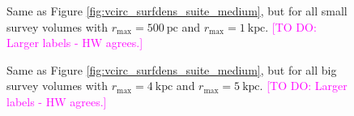 \documentclass[iop,revtex4,numberedappendix,appendixfloats]{emulateapj}
\newcommand{\Wilma}[1]{\textcolor{Magenta}{#1}}
\begin{document}
\begin{figure}[!htbp]
\centering
	\caption{Same as Figure \ref{fig:vcirc_surfdens_suite_medium}, but for all small survey volumes with $r_\text{max}=500~\text{pc}$ and $r_\text{max}=1~\text{kpc}$. \Wilma{[TO DO: Larger labels - HW agrees.]}}
\label{fig:vcirc_surfdens_suite_small}
\end{figure}

\begin{figure}[!htbp]
\centering
	\caption{Same as Figure \ref{fig:vcirc_surfdens_suite_medium}, but for all big survey volumes with $r_\text{max}=4~\text{kpc}$ and $r_\text{max}=5~\text{kpc}$. \Wilma{[TO DO: Larger labels - HW agrees.]}}
\label{fig:vcirc_surfdens_suite_big}
\end{figure}
\end{document}
